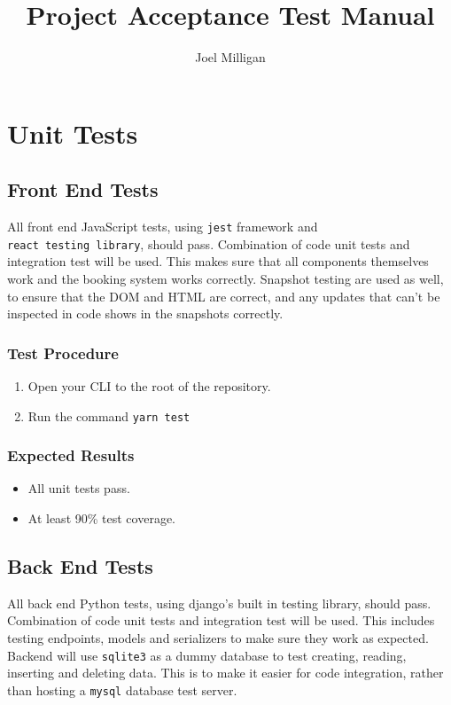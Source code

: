 \documentclass[a4paper, draft]{article}
\author{Joel Milligan}
\title{Project Acceptance Test Manual}
\begin{document}
\setcounter{tocdepth}{2}
\setcounter{secnumdepth}{2}

\maketitle
\tableofcontents

\newpage
\section{Unit Tests}
\subsection{Front End Tests}
All front end JavaScript tests, using \texttt{jest} framework and \\ \texttt{react testing library}, should pass. Combination of code unit tests and integration test will be used. This makes sure that all components themselves work and the booking system works correctly. Snapshot testing are used as well, to ensure that the DOM and HTML are correct, and any updates that can't be inspected in code shows in the snapshots correctly.

\subsubsection{Test Procedure}
\begin{enumerate}
  \item Open your CLI to the root of the repository.
  \item Run the command \texttt{yarn test}
\end{enumerate}

\subsubsection{Expected Results}
\begin{itemize}
  \item All unit tests pass.
  \item At least 90\% test coverage.
\end{itemize}

\subsection{Back End Tests}
All back end Python tests, using django's built in testing library, should pass. Combination of code unit tests and integration test will be used. This includes testing endpoints, models and serializers to make sure they work as expected. Backend will use \texttt{sqlite3} as a dummy database to test creating, reading, inserting and deleting data. This is to make it easier for code integration, rather than hosting a \texttt{mysql} database test server.
\end{document}
